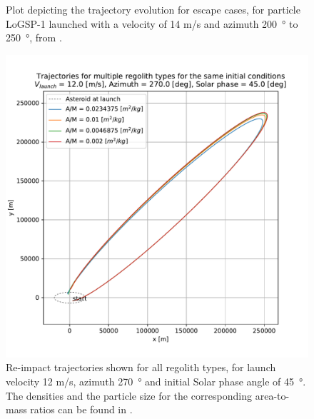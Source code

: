 \documentclass[print]{tudelft-report}
\begin{document}
\begin{appendices}
\begin{figure}[htb]
    \caption{Plot depicting the trajectory evolution for escape cases, for particle LoGSP-1 launched with a velocity of 14 m/s and azimuth \SI{200}{\degree} to \SI{250}{\degree}, from \protect{}.}
    \label{fig:leadingEdge_logsp1_escape_traj_14ms_200_250_azim_solar225}
    \end{figure}
    \FloatBarrier
    \begin{figure}[htb]
    \centering
    \captionsetup{justification=centering}
    \includegraphics[width=\textwidth, height=0.5\textheight, keepaspectratio=true]{Results/Images/trailing_edge_perturbations/reimpact_traj_12ms_270Azim_45solarPhase.pdf}
    \caption{Re-impact trajectories shown for all regolith types, for launch velocity 12 m/s, azimuth \SI{270}{\degree} and initial Solar phase angle of \SI{45}{\degree}. The densities and the particle size for the corresponding area-to-mass ratios can be found in .}
    \label{fig:trailingEdge_reimpact_traj_12ms_270azim_45solar}
    \end{figure}
    \FloatBarrier
    \begin{figure}[htb]
    \centering
    \captionsetup{justification=centering}

\end{figure}
\end{appendices}
\end{document}
